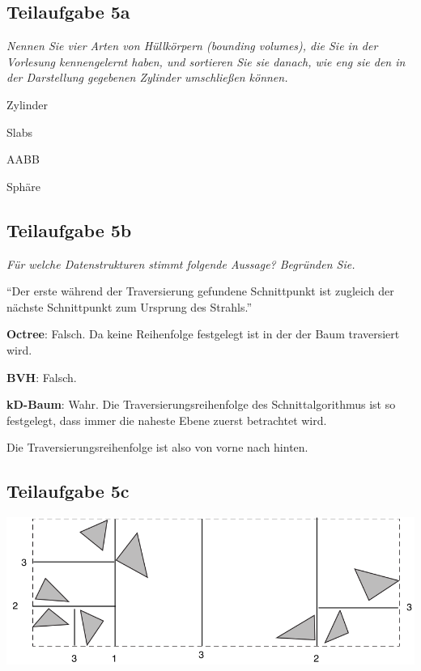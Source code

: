 \documentclass[a4paper]{scrartcl}
\begin{document}
\subsection*{Teilaufgabe 5a}
\textit{Nennen Sie vier Arten von Hüllkörpern (bounding volumes), die Sie in
der Vorlesung kennengelernt haben, und sortieren Sie sie danach, wie eng sie
den in der Darstellung gegebenen Zylinder umschließen können.}

\begin{enumerate*}[label=(\Alph*)]
    \item Zylinder
    \item Slabs
    \item AABB
    \item Sphäre
\end{enumerate*}


\subsection*{Teilaufgabe 5b}
\textit{Für welche Datenstrukturen stimmt folgende Aussage? Begründen Sie.}

\enquote{Der erste während der Traversierung gefundene Schnittpunkt ist
zugleich der nächste Schnittpunkt zum Ursprung des Strahls.}

\textbf{Octree}: Falsch. Da keine Reihenfolge festgelegt ist in der der Baum
                 traversiert wird.

\textbf{BVH}: Falsch.

\textbf{kD-Baum}: Wahr. Die Traversierungsreihenfolge des Schnittalgorithmus
                  ist so festgelegt, dass immer die naheste Ebene zuerst
                  betrachtet wird.

                  Die Traversierungsreihenfolge ist also von vorne nach hinten.

\subsection*{Teilaufgabe 5c}
\includegraphics*[width=\linewidth, keepaspectratio]{5c.png}
\end{document}
